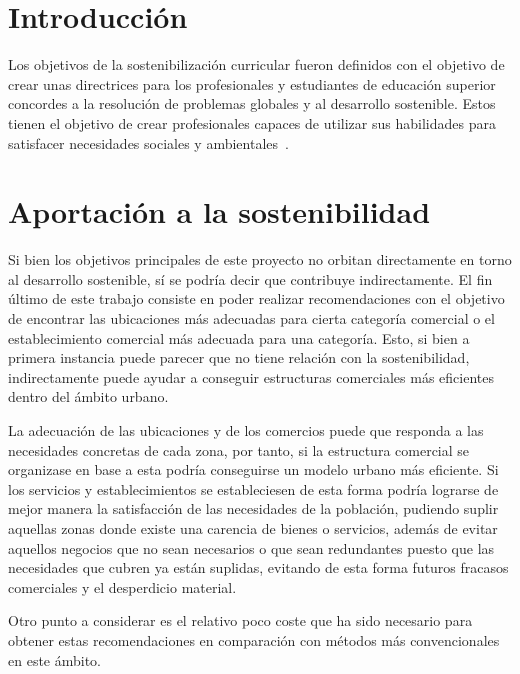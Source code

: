 
\section{Introducción}

Los objetivos de la sostenibilización curricular fueron definidos con el objetivo de crear unas directrices para los profesionales y estudiantes de educación superior concordes a la resolución de problemas globales y al desarrollo sostenible. Estos tienen el objetivo de crear profesionales capaces de utilizar sus habilidades para satisfacer necesidades sociales y ambientales~\cite{direcsost}.



\section{Aportación a la sostenibilidad}

Si bien los objetivos principales de este proyecto no orbitan directamente en torno al desarrollo sostenible, sí se podría decir que contribuye indirectamente. El fin último de este trabajo consiste en poder realizar recomendaciones con el objetivo de encontrar las ubicaciones más adecuadas para cierta categoría comercial o el establecimiento comercial más adecuada para una categoría. Esto, si bien a primera instancia puede parecer que no tiene relación con la sostenibilidad, indirectamente puede ayudar a conseguir estructuras comerciales más eficientes dentro del ámbito urbano.

La adecuación de las ubicaciones y de los comercios puede que responda a las necesidades concretas de cada zona, por tanto, si la estructura comercial se organizase en base a esta podría conseguirse un modelo urbano más eficiente. Si los servicios y establecimientos se estableciesen de esta forma podría lograrse de mejor manera la satisfacción de las necesidades de la población, pudiendo suplir aquellas zonas donde existe una carencia de bienes o servicios, además de evitar aquellos negocios que no sean necesarios o que sean redundantes puesto que las necesidades que cubren ya están suplidas, evitando de esta forma futuros fracasos comerciales y el desperdicio material.

Otro punto a considerar es el relativo poco coste que ha sido necesario para obtener estas recomendaciones en comparación con métodos más convencionales en este ámbito.
